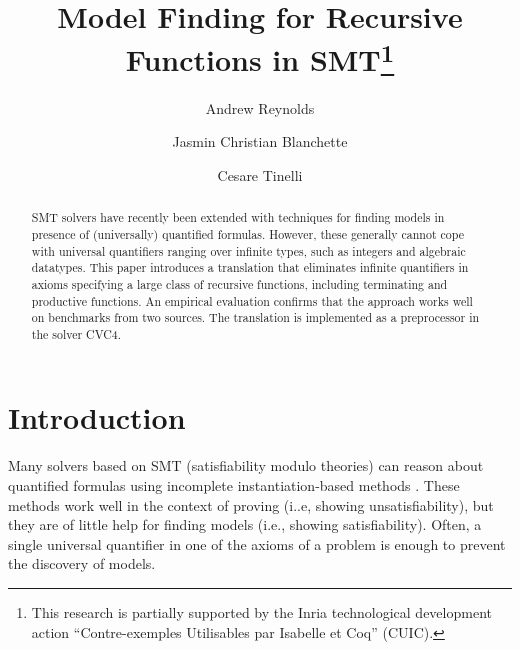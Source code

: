 \documentclass[runningheads,a4paper]{llncs}
\newcommand\cvc{CVC4\xspace}
\newcommand{\rem}[1]{\textcolor{red}{[#1]}}
\newcommand{\ct}[1]{\rem{#1 --ct}}
\begin{document}
\title{Model Finding for Recursive Functions in SMT\thanks{%
This research is partially supported by the Inria technological development
action ``Contre-exemples Utilisables par Isabelle et Coq'' (CUIC).
}
}

\author {Andrew Reynolds \and Jasmin Christian Blanchette \and Cesare Tinelli }

\maketitle

\begin{abstract}
SMT solvers have recently been extended with techniques for finding models
in presence of (universally) quantified formulas.
However, these generally cannot cope with universal quantifiers ranging over
infinite types, such as integers and algebraic datatypes. This paper introduces
a translation that eliminates infinite quantifiers in axioms specifying a large
class of recursive functions, including terminating and
productive functions. An empirical evaluation confirms that the approach works
well on benchmarks from two sources. The translation is implemented as a
preprocessor in the solver CVC4.
\end{abstract}

\setcounter{footnote}{0}

\section{Introduction}
\label{sec:introduction}


Many solvers based on SMT (satisfiability modulo theories) can reason about
quantified formulas using incomplete instantiation-based methods
\cite{MouraBjoerner07,ReynoldsTinelliMoura14}.
These methods work well in the context of proving (i..e, showing
unsatisfiability), but they are of little help for finding models (i.e.,
showing satisfiability). Often, a single universal quantifier in one of the
axioms of a problem is enough to prevent the discovery of models.
\end{document}
